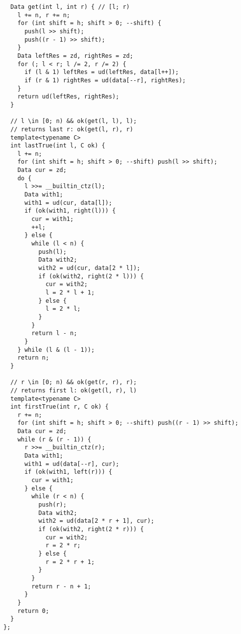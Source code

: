 \begin{lstlisting}
  Data get(int l, int r) { // [l; r)
    l += n, r += n;
    for (int shift = h; shift > 0; --shift) {
      push(l >> shift);
      push((r - 1) >> shift);
    }
    Data leftRes = zd, rightRes = zd;
    for (; l < r; l /= 2, r /= 2) {
      if (l & 1) leftRes = ud(leftRes, data[l++]);
      if (r & 1) rightRes = ud(data[--r], rightRes);
    }
    return ud(leftRes, rightRes);
  }

  // l \in [0; n) && ok(get(l, l), l);
  // returns last r: ok(get(l, r), r)
  template<typename C>
  int lastTrue(int l, C ok) {
    l += n;
    for (int shift = h; shift > 0; --shift) push(l >> shift);
    Data cur = zd;
    do {
      l >>= __builtin_ctz(l);
      Data with1;
      with1 = ud(cur, data[l]);
      if (ok(with1, right(l))) {
        cur = with1;
        ++l;
      } else {
        while (l < n) {
          push(l);
          Data with2;
          with2 = ud(cur, data[2 * l]);
          if (ok(with2, right(2 * l))) {
            cur = with2;
            l = 2 * l + 1;
          } else {
            l = 2 * l;
          }
        }
        return l - n;
      }
    } while (l & (l - 1));
    return n;
  }

  // r \in [0; n) && ok(get(r, r), r);
  // returns first l: ok(get(l, r), l)
  template<typename C>
  int firstTrue(int r, C ok) {
    r += n;
    for (int shift = h; shift > 0; --shift) push((r - 1) >> shift);
    Data cur = zd;
    while (r & (r - 1)) {
      r >>= __builtin_ctz(r);
      Data with1;
      with1 = ud(data[--r], cur);
      if (ok(with1, left(r))) {
        cur = with1;
      } else {
        while (r < n) {
          push(r);
          Data with2;
          with2 = ud(data[2 * r + 1], cur);
          if (ok(with2, right(2 * r))) {
            cur = with2;
            r = 2 * r;
          } else {
            r = 2 * r + 1;
          }
        }
        return r - n + 1;
      }
    }
    return 0;
  }
};
\end{lstlisting}
